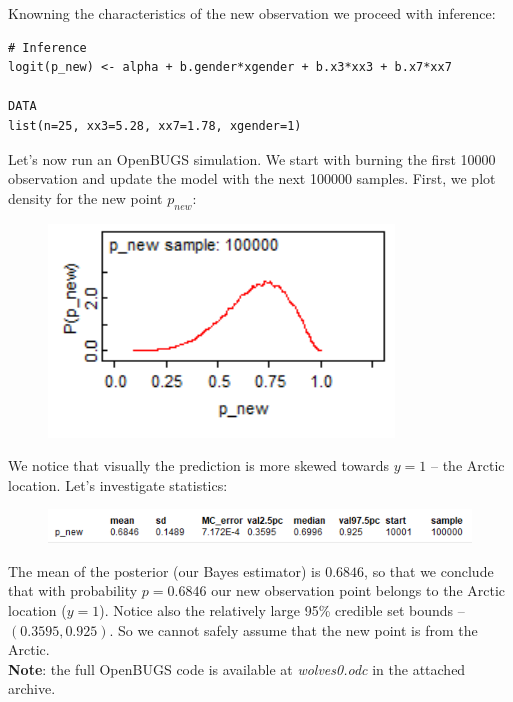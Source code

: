 \documentclass[a4 paper]{article}
\begin{document}
Knowning the characteristics 
of the new observation we proceed with inference:
\begin{Verbatim}
# Inference
logit(p_new) <- alpha + b.gender*xgender + b.x3*xx3 + b.x7*xx7

DATA
list(n=25, xx3=5.28, xx7=1.78, xgender=1) 
\end{Verbatim} 

Let's now run an OpenBUGS simulation. We start 
with burning 
the first 10000 observation and update the model 
with the next 100000 samples. First, we plot 
density for the new point $p_{new}$:

\begin{figure}[H]
	\includegraphics[scale=1.0]{q2}
	\centering
	\label{q2}
\end{figure}

We notice that visually the prediction
is more skewed towards $y=1$ -- the Arctic location.
Let's investigate statistics:

\begin{figure}[H]
	\includegraphics[scale=1.0]{q2_2}
	\centering
	\label{q2_2}
\end{figure}

The mean of the posterior (our Bayes estimator)
is $0.6846$, so that we conclude that with 
probability $p=0.6846$ our new observation 
point belongs to the Arctic location ($y=1$).
Notice also the relatively large 95\% credible set 
bounds -- $(0.3595, 0.925)$. So we cannot 
safely assume that the new point is from the Arctic. \\


\textbf{Note}: the full OpenBUGS code is available 
at \textit{wolves0.odc} in the attached archive.


\end{document}
